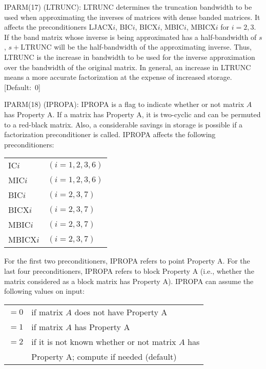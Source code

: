 \begin{list}{}{
               \leftmargin 1.00in \rightmargin 0.25in}
\item[IPARM(17) \hfill](LTRUNC):
         LTRUNC determines the truncation bandwidth to be used when
         approximating the inverses of matrices with dense banded
         matrices.  It affects the preconditioners LJACX$i$, BIC$i$,
         BICX$i$, MBIC$i$, MBICX$i$ for $i=2,3$.  If the band matrix 
         whose inverse is being approximated has a half-bandwidth of 
         $s$, $s+\mbox{LTRUNC}$ will be the half-bandwidth
         of the approximating inverse.  Thus, LTRUNC is the increase
         in bandwidth to be used for the inverse approximation over
         the bandwidth of the original matrix.  In general, an
         increase in LTRUNC means a more accurate factorization at
         the expense of increased storage.  \mbox{[Default: $0$]}
 
\item[IPARM(18) \hfill](IPROPA):
         IPROPA is a flag to indicate whether or not matrix $A$ has
         Property A.  If a matrix has Property A, it is two-cyclic
         and can be permuted to a red-black matrix.  Also, a
         considerable savings in storage is possible if a factorization
         preconditioner is called.  IPROPA affects the following
         preconditioners:
 
         \begin{tabular}{ll}
            IC$i$    & $(i=1,2,3,6)$ \\
            MIC$i$   & $(i=1,2,3,6)$ \\
            BIC$i$   & $(i=2,3,7)$ \\
            BICX$i$  & $(i=2,3,7)$ \\
            MBIC$i$  & $(i=2,3,7)$ \\
            MBICX$i$ & $(i=2,3,7)$
         \end{tabular}
 
         For the first two preconditioners, IPROPA refers to point
         Property A.  For the last four preconditioners, IPROPA
         refers to block Property A (i.e., whether the matrix
         considered as a block matrix has Property A).  IPROPA
         can assume the following values on input:
 
         \begin{tabular}{lp{3.5in}}
           $= 0$ & if matrix $A$ does not have Property A \\
           $= 1$ & if matrix $A$ has Property A           \\
           $= 2$ & if it is not known whether or not matrix $A$ has \\
                 & \hspace{0.1in} Property A; compute if needed (default)
         \end{tabular}
 

\end{list}
